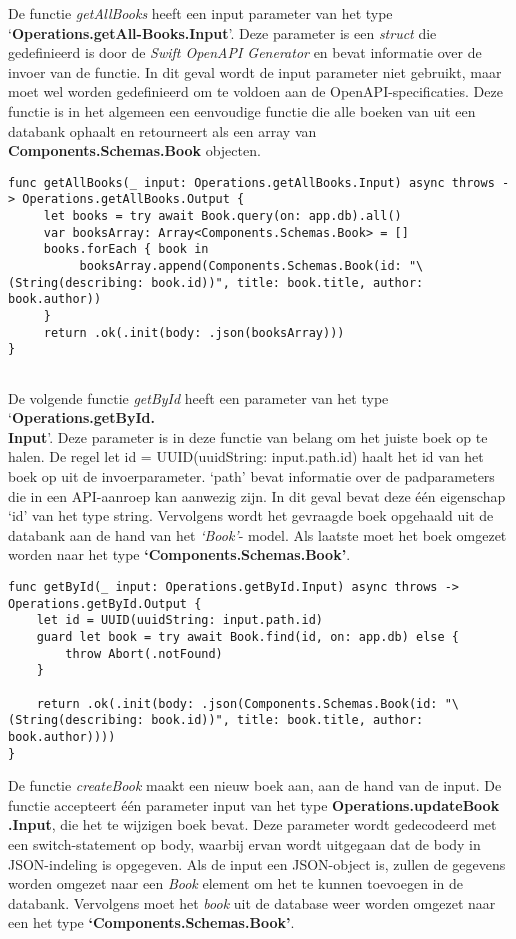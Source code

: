 De functie \textit{getAllBooks} heeft een input parameter van het type ‘\textbf{Operations.getAll-Books.Input}’. Deze parameter is een \textit{struct} die gedefinieerd is door de \textit{Swift OpenAPI Generator} en bevat informatie over de invoer van de functie. In dit geval wordt de input parameter niet gebruikt, maar moet wel worden gedefinieerd om te voldoen aan de OpenAPI-specificaties. Deze functie is in het algemeen een eenvoudige functie die alle boeken van uit een databank ophaalt en retourneert als een array van \textbf{Components.Schemas.Book} objecten. 
\begin{lstlisting}[caption=handler file - getAllBooks]
func getAllBooks(_ input: Operations.getAllBooks.Input) async throws -> Operations.getAllBooks.Output {
     let books = try await Book.query(on: app.db).all()
     var booksArray: Array<Components.Schemas.Book> = []
     books.forEach { book in
          booksArray.append(Components.Schemas.Book(id: "\(String(describing: book.id))", title: book.title, author: book.author))
     }
     return .ok(.init(body: .json(booksArray)))
}
        

\end{lstlisting}
De volgende functie \textit{getById} heeft een parameter van het type ‘\textbf{Operations.getById.\\Input}’. Deze parameter is in deze functie van belang om het juiste boek op te halen. De regel let id = UUID(uuidString: input.path.id) haalt het id van het boek op uit de invoerparameter. ‘path’ bevat informatie over de padparameters die in een API-aanroep kan aanwezig zijn. In dit geval bevat deze één eigenschap ‘id’ van het type string. Vervolgens wordt het gevraagde boek opgehaald uit de databank aan de hand van het \textit{‘Book’}- model. Als laatste moet het boek omgezet worden naar het type \textbf{‘Components.Schemas.Book’}.

\begin{lstlisting}[caption=handler file - getById]
func getById(_ input: Operations.getById.Input) async throws -> Operations.getById.Output {
    let id = UUID(uuidString: input.path.id)
    guard let book = try await Book.find(id, on: app.db) else {
        throw Abort(.notFound)
    }
        
    return .ok(.init(body: .json(Components.Schemas.Book(id: "\(String(describing: book.id))", title: book.title, author: book.author))))
}
\end{lstlisting}

De functie \textit{createBook} maakt een nieuw boek aan, aan de hand van de input. De functie accepteert één parameter input van het type \textbf{Operations.updateBook\\.Input}, die het te wijzigen boek bevat. Deze parameter wordt gedecodeerd met een switch-statement op body, waarbij ervan wordt uitgegaan dat de body in JSON-indeling is opgegeven. Als de input een JSON-object is, zullen de gegevens worden omgezet naar een \textit{Book} element om het te kunnen toevoegen in de databank.  Vervolgens moet het \textit{book} uit de database weer worden omgezet naar een het type \textbf{‘Components.Schemas.Book’}. 

